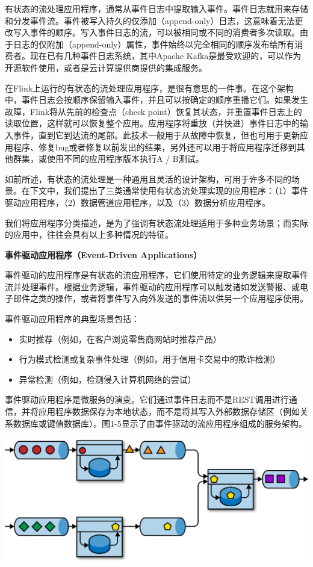 \documentclass[oneside]{ctexbook}
\begin{document}
有状态的流处理应用程序，通常从事件日志中提取输入事件。事件日志就用来存储和分发事件流。事件被写入持久的仅添加（append-only）日志，这意味着无法更改写入事件的顺序。写入事件日志的流，可以被相同或不同的消费者多次读取。由于日志的仅附加（append-only）属性，事件始终以完全相同的顺序发布给所有消费者。现在已有几种事件日志系统，其中Apache Kafka是最受欢迎的，可以作为开源软件使用，或者是云计算提供商提供的集成服务。

在Flink上运行的有状态的流处理应用程序，是很有意思的一件事。在这个架构中，事件日志会按顺序保留输入事件，并且可以按确定的顺序重播它们。如果发生故障，Flink将从先前的检查点（check point）恢复其状态，并重置事件日志上的读取位置，这样就可以恢复整个应用。应用程序将重放（并快进）事件日志中的输入事件，直到它到达流的尾部。此技术一般用于从故障中恢复，但也可用于更新应用程序、修复bug或者修复以前发出的结果，另外还可以用于将应用程序迁移到其他群集，或使用不同的应用程序版本执行A / B测试。

如前所述，有状态的流处理是一种通用且灵活的设计架构，可用于许多不同的场景。在下文中，我们提出了三类通常使用有状态流处理实现的应用程序：（1）事件驱动应用程序，（2）数据管道应用程序，以及（3）数据分析应用程序。

我们将应用程序分类描述，是为了强调有状态流处理适用于多种业务场景；而实际的应用中，往往会具有以上多种情况的特征。

\textbf{事件驱动应用程序（Event-Driven Applications）}

事件驱动的应用程序是有状态的流应用程序，它们使用特定的业务逻辑来提取事件流并处理事件。根据业务逻辑，事件驱动的应用程序可以触发诸如发送警报、或电子邮件之类的操作，或者将事件写入向外发送的事件流以供另一个应用程序使用。

事件驱动应用程序的典型场景包括：

\begin{itemize}
  \item 实时推荐（例如，在客户浏览零售商网站时推荐产品）
  \item 行为模式检测或复杂事件处理（例如，用于信用卡交易中的欺诈检测）
  \item 异常检测（例如，检测侵入计算机网络的尝试）
\end{itemize}

事件驱动应用程序是微服务的演变。它们通过事件日志而不是REST调用进行通信，并将应用程序数据保存为本地状态，而不是将其写入外部数据存储区（例如关系数据库或键值数据库）。图1-5显示了由事件驱动的流应用程序组成的服务架构。

\noindent\includegraphics[]{images/spaf_0105.png}
\end{document}
